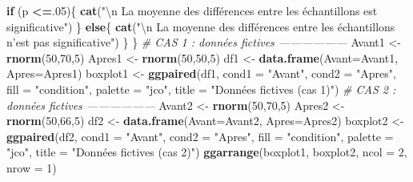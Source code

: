 \documentclass[
  11pt,
  french,
]{book}
\makeatletter
\newenvironment{Shaded}{\begin{snugshade}}{\end{snugshade}}
\newcommand{\CharTok}[1]{\textcolor[rgb]{0.31,0.60,0.02}{#1}}
\newcommand{\CommentTok}[1]{\textcolor[rgb]{0.56,0.35,0.01}{\textit{#1}}}
\newcommand{\ControlFlowTok}[1]{\textcolor[rgb]{0.13,0.29,0.53}{\textbf{#1}}}
\newcommand{\DataTypeTok}[1]{\textcolor[rgb]{0.13,0.29,0.53}{#1}}
\newcommand{\DecValTok}[1]{\textcolor[rgb]{0.00,0.00,0.81}{#1}}
\newcommand{\KeywordTok}[1]{\textcolor[rgb]{0.13,0.29,0.53}{\textbf{#1}}}
\newcommand{\NormalTok}[1]{#1}
\newcommand{\OperatorTok}[1]{\textcolor[rgb]{0.81,0.36,0.00}{\textbf{#1}}}
\newcommand{\StringTok}[1]{\textcolor[rgb]{0.31,0.60,0.02}{#1}}
\newenvironment{kframe}{%
\medskip{}
\setlength{\fboxsep}{.8em}
 \def\at@end@of@kframe{}%
 \ifinner\ifhmode%
  \def\at@end@of@kframe{\end{minipage}}%
  \begin{minipage}{\columnwidth}%
 \fi\fi%
 \def\FrameCommand##1{\hskip\@totalleftmargin \hskip-\fboxsep
 \colorbox{shadecolor}{##1}\hskip-\fboxsep
     \hskip-\linewidth \hskip-\@totalleftmargin \hskip\columnwidth}%
 \MakeFramed {\advance\hsize-\width
   \@totalleftmargin\z@ \linewidth\hsize
   \@setminipage}}%
 {\par\unskip\endMakeFramed%
 \at@end@of@kframe}
\renewenvironment{Shaded}{\begin{kframe}}{\end{kframe}}
\makeatother
\begin{document}
\begin{Shaded}
\begin{Highlighting}[]
  \ControlFlowTok{if}\NormalTok{ (p }\OperatorTok{<=}\NormalTok{.}\DecValTok{05}\NormalTok{)\{}
    \KeywordTok{cat}\NormalTok{(}\StringTok{"}\CharTok{\textbackslash{}n}\StringTok{ La moyenne des différences entre les échantillons est significative"}\NormalTok{)}
\NormalTok{  \}}
  \ControlFlowTok{else}\NormalTok{\{}
    \KeywordTok{cat}\NormalTok{(}\StringTok{"}\CharTok{\textbackslash{}n}\StringTok{ La moyenne des différences entre les échantillons n'est pas significative"}\NormalTok{)}
\NormalTok{  \}}
\NormalTok{\}}
\CommentTok{# CAS 1 : données fictives ------------------}
\NormalTok{Avant1 <-}\StringTok{ }\KeywordTok{rnorm}\NormalTok{(}\DecValTok{50}\NormalTok{,}\DecValTok{70}\NormalTok{,}\DecValTok{5}\NormalTok{)}
\NormalTok{Apres1 <-}\StringTok{ }\KeywordTok{rnorm}\NormalTok{(}\DecValTok{50}\NormalTok{,}\DecValTok{50}\NormalTok{,}\DecValTok{5}\NormalTok{)}
\NormalTok{df1 <-}\StringTok{ }\KeywordTok{data.frame}\NormalTok{(}\DataTypeTok{Avant=}\NormalTok{Avant1, }\DataTypeTok{Apres=}\NormalTok{Apres1)}
\NormalTok{boxplot1 <-}\StringTok{ }\KeywordTok{ggpaired}\NormalTok{(df1, }\DataTypeTok{cond1 =} \StringTok{"Avant"}\NormalTok{, }\DataTypeTok{cond2 =} \StringTok{"Apres"}\NormalTok{, }\DataTypeTok{fill =} \StringTok{"condition"}\NormalTok{, }
                     \DataTypeTok{palette =} \StringTok{"jco"}\NormalTok{, }\DataTypeTok{title =} \StringTok{"Données fictives (cas 1)"}\NormalTok{)}
\CommentTok{# CAS 2 : données fictives ------------------}
\NormalTok{Avant2 <-}\StringTok{ }\KeywordTok{rnorm}\NormalTok{(}\DecValTok{50}\NormalTok{,}\DecValTok{70}\NormalTok{,}\DecValTok{5}\NormalTok{)}
\NormalTok{Apres2 <-}\StringTok{ }\KeywordTok{rnorm}\NormalTok{(}\DecValTok{50}\NormalTok{,}\DecValTok{66}\NormalTok{,}\DecValTok{5}\NormalTok{)}
\NormalTok{df2 <-}\StringTok{ }\KeywordTok{data.frame}\NormalTok{(}\DataTypeTok{Avant=}\NormalTok{Avant2, }\DataTypeTok{Apres=}\NormalTok{Apres2)}
\NormalTok{boxplot2 <-}\StringTok{ }\KeywordTok{ggpaired}\NormalTok{(df2, }\DataTypeTok{cond1 =} \StringTok{"Avant"}\NormalTok{, }\DataTypeTok{cond2 =} \StringTok{"Apres"}\NormalTok{, }\DataTypeTok{fill =} \StringTok{"condition"}\NormalTok{, }
                     \DataTypeTok{palette =} \StringTok{"jco"}\NormalTok{, }\DataTypeTok{title =} \StringTok{"Données fictives (cas 2)"}\NormalTok{)}
\KeywordTok{ggarrange}\NormalTok{(boxplot1, boxplot2, }\DataTypeTok{ncol =} \DecValTok{2}\NormalTok{, }\DataTypeTok{nrow =} \DecValTok{1}\NormalTok{)}
\end{Highlighting}
\end{Shaded}
\end{document}
